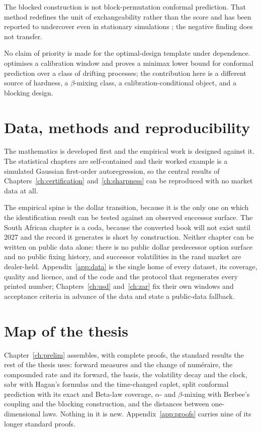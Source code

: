 \documentclass[../../../main.tex]{subfiles}
\begin{document}
The blocked construction is not block-permutation conformal prediction. That method redefines the unit of exchangeability rather than the score and has been reported to undercover even in stationary simulations \citep[p.~15]{stocker2025}; the negative finding does not transfer.

No claim of priority is made for the optimal-design template under dependence. \citet{halkiewicz2026} optimises a calibration window and proves a minimax lower bound for conformal prediction over a class of drifting processes; the contribution here is a different source of hardness, a $\beta$-mixing class, a calibration-conditional object, and a blocking design.

\section{Data, methods and reproducibility}\label{sec:intro-data}

The mathematics is developed first and the empirical work is designed against it. The statistical chapters are self-contained and their worked example is a simulated Gaussian first-order autoregression, so the central results of Chapters~\ref{ch:certification} and~\ref{ch:sharpness} can be reproduced with no market data at all.

The empirical spine is the dollar transition, because it is the only one on which the identification result can be tested against an observed successor surface. The South African chapter is a coda, because the converted book will not exist until 2027 and the record it generates is short by construction. Neither chapter can be written on public data alone: there is no public dollar predecessor option surface and no public fixing history, and successor volatilities in the rand market are dealer-held. Appendix~\ref{app:data} is the single home of every dataset, its coverage, quality and licence, and of the code and the protocol that regenerates every printed number; Chapters~\ref{ch:usd} and~\ref{ch:zar} fix their own windows and acceptance criteria in advance of the data and state a public-data fallback.

\section{Map of the thesis}\label{sec:intro-map}

Chapter~\ref{ch:prelim} assembles, with complete proofs, the standard results the rest of the thesis uses: forward measures and the change of num\'eraire, the compounded rate and its forward, the basis, the volatility decay and the clock, \gls{sabr} with Hagan's formulas and the time-changed caplet, split conformal prediction with its exact and Beta-law coverage, $\alpha$- and $\beta$-mixing with Berbee's coupling and the blocking construction, and the distances between one-dimensional laws. Nothing in it is new. Appendix~\ref{app:proofs} carries nine of its longer standard proofs.
\end{document}
